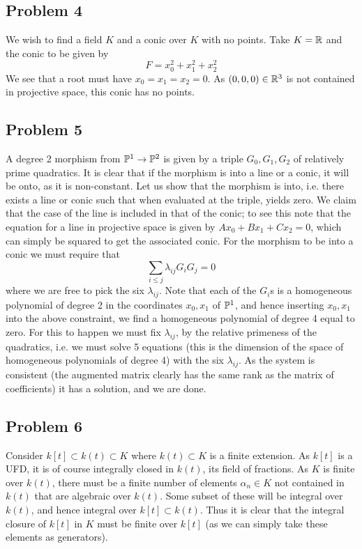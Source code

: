 \documentclass{../../mathnotes}
\begin{document}
\subsection*{Problem 4}

We wish to find a field $K$ and a conic over $K$ with no points. Take $K=\mathbb{R}$ and the conic to be given by
\[F=x_0^2+x_1^2+x_2^2\]
We see that a root must have $x_0=x_1=x_2=0$. As $(0,0,0)\in\mathbb{R}^3$ is not contained in projective space, this conic has no points.

\subsection*{Problem 5}

A degree 2 morphism from $\mathbb{P}^1\to\mathbb{P}^2$ is given by a triple $G_0,G_1,G_2$ of relatively prime quadratics. It is clear that if the
morphism is into a line or a conic, it will be onto, as it is non-constant. Let us show that the morphism is into, i.e. there exists
a line or conic such that when evaluated at the triple, yields zero. We claim that the case of the line is included in that of the conic; to see
this note that the equation for a line in projective space is given by $Ax_0+Bx_1+Cx_2=0$, which can simply be squared to get the associated
conic. For the morphism to be into a conic we must require that 
\[\sum_{i\leq j}\lambda_{ij}G_iG_j=0\]
where we are free to pick the six $\lambda_{ij}$. Note that each of the $G_i$s is a homogeneous polynomial of degree 2 in the coordinates $x_0,x_1$
of $\mathbb{P}^1$, and hence inserting $x_0,x_1$ into the above constraint, we find a homogeneous polynomial of degree 4 equal to zero. 
For this to happen we must fix $\lambda_{ij}$, by the relative primeness of the quadratics, i.e. we must solve 5 equations (this is the dimension
of the space of homogeneous polynomials of degree 4) with the six $\lambda_{ij}$. As the system is consistent (the augmented matrix clearly has the same
rank as the matrix of coefficients) it has a solution, and we are done.

\subsection*{Problem 6}

Consider $k[t]\subset k(t)\subset K$ where $k(t)\subset K$ is a finite extension. As $k[t]$ is a UFD, it is of course
integrally closed in $k(t)$, its field of fractions. As $K$ is finite over $k(t)$, there must be a finite number of elements
$\alpha_n\in K$ not contained in $k(t)$ that are algebraic over $k(t)$. Some subset of these will be integral over $k(t)$,
and hence integral over $k[t]\subset k(t)$. Thus it is clear that the integral closure of $k[t]$ in $K$ must be finite over
$k[t]$ (as we can simply take these elements as generators).
\end{document}
